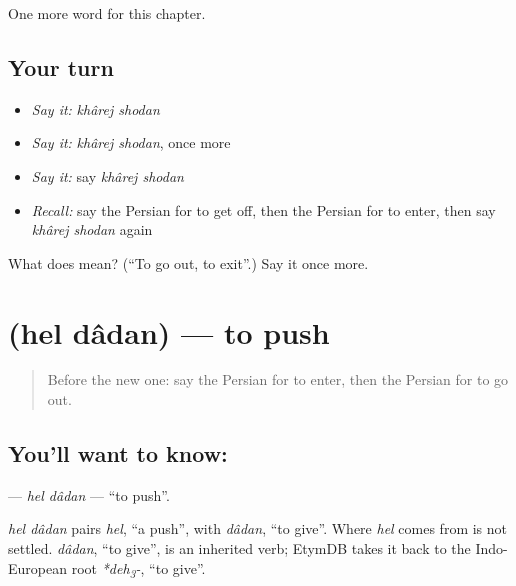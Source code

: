\begin{grammarlens}[title={What you've built}]
One more word for this chapter.
\end{grammarlens}

\subsection*{Your turn}
\begin{itemize}
\raggedright
  \item \emph{Say it:} \emph{khârej shodan}
  \item \emph{Say it:} \emph{khârej shodan}, once more
  \item \emph{Say it:} say \emph{khârej shodan}
  \item \emph{Recall:} say the Persian for to get off, then the Persian for to enter, then say \emph{khârej shodan} again
\end{itemize}

\begin{tcolorbox}[breakable,colback=teal!4,colframe=teal!35!black,title={Before you move on}]
What does   mean? (\textquotedblleft{}To go out, to exit\textquotedblright{}.) Say it once more.
\end{tcolorbox}
\section[\texorpdfstring{\fa{هل} \fa{دادن} (hel dâdan)}{هل دادن (hel dâdan)}]{  (hel dâdan) — to push}

\label{lesson:FA-C253-hel-dadan}



\begin{quote}
Before the new one: say the Persian for to enter, then the Persian for to go out.
\end{quote}

\subsection*{You'll want to know:  }
\textbf{ } — \emph{hel dâdan} — \textquotedblleft{}to push\textquotedblright{}.

\begin{cousinweb}
\emph{hel dâdan} pairs \emph{hel}, \textquotedblleft{}a push\textquotedblright{}, with \emph{dâdan}, \textquotedblleft{}to give\textquotedblright{}. Where \emph{hel} comes from is not settled. \emph{dâdan}, \textquotedblleft{}to give\textquotedblright{}, is an inherited verb; EtymDB takes it back to the Indo-European root \emph{*deh\textsubscript{3}-}, \textquotedblleft{}to give\textquotedblright{}.
\end{cousinweb}

